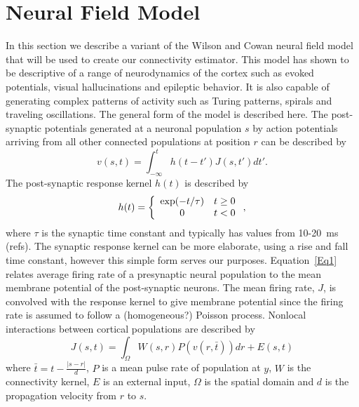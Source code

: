 \documentclass[onecolumn,draftcls]{IEEEtran}
\begin{document}
\section{Neural Field Model}
In this section we describe a variant of the  Wilson and Cowan neural field model~\cite{Wilson1973} that will be used to create our connectivity estimator. This model has shown to be descriptive of a range of neurodynamics of the cortex such as evoked potentials, visual hallucinations and epileptic behavior. It is also capable of generating complex patterns of activity such as Turing patterns, spirals and traveling oscillations. The general form of the model is described here. The post-synaptic potentials generated at a neuronal population $s$ by action potentials arriving from all other connected populations at position $r$ can be described by
\begin{equation}\label{Eq1}
v\left( {s,t} \right) = \int_{ - \infty }^t {h\left( {t - t'} \right)J\left( {s,t'} \right)dt'}.
\end{equation}
The post-synaptic response kernel $h(t)$ is described by
\begin{equation}\label{Eq2}
h(t) = \left\{ {\begin{array}{*{20}{c}}
   {\exp ( - {t \mathord{\left/
 {\vphantom {t \tau }} \right.
 \kern-\nulldelimiterspace} \tau })} & {t \ge 0}  \\
   0 & {t < 0}  \\
\end{array}} \right.,
\end{equation}
where $\tau$ is the synaptic time constant and typically has values from 10-20~ms (\textcolor[rgb]{1.00,0.00,0.00}{refs}). The synaptic response kernel can be more elaborate, using a rise and fall time constant, however this simple form serves our purposes. Equation~\ref{Eq1} relates average firing rate of a presynaptic neural population to the mean membrane potential of the post-synaptic neurons. The mean firing rate, $J$, is convolved with the response kernel to give membrane potential since the firing rate is assumed to follow a (homogeneous?) Poisson process. Nonlocal interactions between cortical populations are described by	
\begin{equation}\label{Eq3}
J\left( {s,t} \right) = \int_\Omega  {W\left( {s,r} \right)P\left( {v\left( {r,\bar t} \right)} \right)dr}  + E\left( {s,t} \right)
\end{equation}
where $\bar t = t - \frac{{\left| {s - r} \right|}}{d}$, $P$ is a mean pulse rate of population at $y$, $W$ is the connectivity kernel, $E$ is an external input, $\Omega$ is the spatial domain and $d$ is the propagation velocity from $r$ to $s$.
\end{document}
